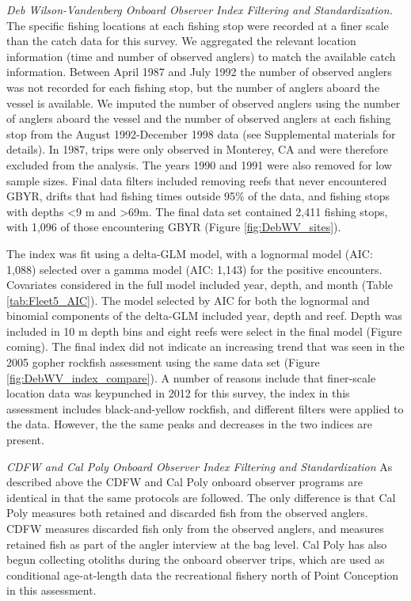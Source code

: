 \documentclass[12pt,]{article}
\begin{document}
\emph{Deb Wilson-Vandenberg Onboard Observer Index Filtering and
Standardization.} The specific fishing locations at each fishing stop
were recorded at a finer scale than the catch data for this survey. We
aggregated the relevant location information (time and number of
observed anglers) to match the available catch information. Between
April 1987 and July 1992 the number of observed anglers was not recorded
for each fishing stop, but the number of anglers aboard the vessel is
available. We imputed the number of observed anglers using the number of
anglers aboard the vessel and the number of observed anglers at each
fishing stop from the August 1992-December 1998 data (see Supplemental
materials for details). In 1987, trips were only observed in Monterey,
CA and were therefore excluded from the analysis. The years 1990 and
1991 were also removed for low sample sizes. Final data filters included
removing reefs that never encountered GBYR, drifts that had fishing
times outside 95\% of the data, and fishing stops with depths
\textless{}9 m and \textgreater{}69m. The final data set contained 2,411
fishing stops, with 1,096 of those encountering GBYR (Figure
\ref{fig:DebWV_sites}).

The index was fit using a delta-GLM model, with a lognormal model (AIC:
1,088) selected over a gamma model (AIC: 1,143) for the positive
encounters. Covariates considered in the full model included year,
depth, and month (Table \ref{tab:Fleet5_AIC}). The model selected by AIC
for both the lognormal and binomial components of the delta-GLM included
year, depth and reef. Depth was included in 10 m depth bins and eight
reefs were select in the final model (Figure coming). The final index
did not indicate an increasing trend that was seen in the 2005 gopher
rockfish assessment using the same data set (Figure
\ref{fig:DebWV_index_compare}). A number of reasons include that
finer-scale location data was keypunched in 2012 for this survey, the
index in this assessment includes black-and-yellow rockfish, and
different filters were applied to the data. However, the the same peaks
and decreases in the two indices are present.

\emph{CDFW and Cal Poly Onboard Observer Index Filtering and
Standardization} As described above the CDFW and Cal Poly onboard
observer programs are identical in that the same protocols are followed.
The only difference is that Cal Poly measures both retained and
discarded fish from the observed anglers. CDFW measures discarded fish
only from the observed anglers, and measures retained fish as part of
the angler interview at the bag level. Cal Poly has also begun
collecting otoliths during the onboard observer trips, which are used as
conditional age-at-length data the recreational fishery north of Point
Conception in this assessment.
\end{document}
